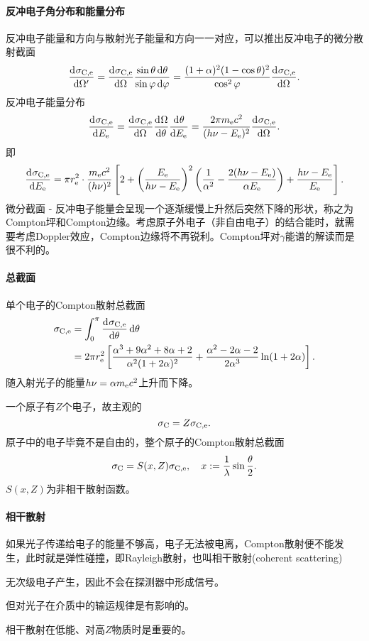 \paragraph{反冲电子角分布和能量分布}
反冲电子能量和方向与散射光子能量和方向一一对应，可以推出反冲电子的微分散射截面
\[
	\frac{\mathrm{d}^{{}}\sigma_{\mathrm C,\mathrm e}}{\mathrm{d}{\Omega'}^{{}}}=\frac{\mathrm{d}^{{}}\sigma_{\mathrm C,\mathrm e}}{\mathrm{d}{\Omega}^{{}}}\frac{\sin\theta\mathop{}\!\mathrm{d}\theta}{\sin\varphi\mathop{}\!\mathrm{d}\varphi}=\frac{(1+\alpha)^2(1-\cos\theta)^2}{\cos^2\varphi}\frac{\mathrm{d}^{{}}\sigma_{\mathrm C,\mathrm e}}{\mathrm{d}{\Omega}^{{}}}.
\]
反冲电子能量分布
\[
	\frac{\mathrm{d}^{{}}\sigma_{\mathrm C,\mathrm e}}{\mathrm{d}{E_\mathrm e}^{{}}}=\frac{\mathrm{d}^{{}}\sigma_{\mathrm C,\mathrm e}}{\mathrm{d}{\Omega}^{{}}}\frac{\mathrm{d}^{{}}\Omega}{\mathrm{d}{\theta}^{{}}}\frac{\mathrm{d}^{{}}\theta}{\mathrm{d}{E_\mathrm e}^{{}}}=\frac{2\pi m_\mathrm e c^2}{(h\nu-E_\mathrm e)^2}\frac{\mathrm{d}^{{}}\sigma_{\mathrm C,\mathrm e}}{\mathrm{d}{\Omega}^{{}}}.
\]
即
\[
	\frac{\mathrm{d}^{{}}\sigma_{\mathrm C,\mathrm e}}{\mathrm{d}{E_\mathrm e}^{{}}}=\pi r_\mathrm e^2\cdot\frac{m_\mathrm e c^2}{(h\nu)^2}\left[2+\left(\frac{E_\mathrm e}{h\nu-E_\mathrm e}\right)^2\left(\frac1{\alpha^2}-\frac{2(h\nu-E_\mathrm e)}{\alpha E_\mathrm e}\right)+\frac{h\nu-E_\mathrm e}{E_\mathrm e}\right].
\]
微分截面 - 反冲电子能量会呈现一个逐渐缓慢上升然后突然下降的形状，称之为Compton坪和Compton边缘。考虑原子外电子（非自由电子）的结合能时，就需要考虑Doppler效应，Compton边缘将不再锐利。Compton坪对$\gamma$能谱的解读而是很不利的。

\paragraph{总截面}单个电子的Compton散射总截面
\begin{align*}
	\sigma_{\mathrm C,\mathrm e}&=\int_0^\pi\frac{\mathrm{d}^{{}}\sigma_{\mathrm C,\mathrm e}}{\mathrm{d}{\theta}^{{}}}\mathop{}\!\mathrm{d}\theta\\
	&=2\pi r_\mathrm e^2\left[\frac{\alpha^3+9\alpha^2+8\alpha+2}{\alpha^2(1+2\alpha)^2}+\frac{\alpha^2-2\alpha-2}{2\alpha^3}\ln(1+2\alpha)\right].
\end{align*}
随入射光子的能量$h\nu=\alpha m_\mathrm e c^2$上升而下降。

一个原子有$Z$个电子，故主观的
\[
	\sigma_\mathrm C=Z\sigma_{\mathrm C,\mathrm e}.
\]
原子中的电子毕竟不是自由的，整个原子的Compton散射总截面
\begin{align}
	\sigma_\mathrm C=S(x,Z)\sigma_{\mathrm C,\mathrm e},\quad x:=\frac1\lambda\sin\frac\theta{2}.
\end{align}
$S(x,Z)$为非相干散射函数。
\paragraph{相干散射}
如果光子传递给电子的能量不够高，电子无法被电离，Compton散射便不能发生，此时就是弹性碰撞，即Rayleigh散射，也叫相干散射(coherent scattering)
\begin{compactenum}
	\item 无次级电子产生，因此不会在探测器中形成信号。
	\item 但对光子在介质中的输运规律是有影响的。
	\item 相干散射在低能、对高$Z$物质时是重要的。
\end{compactenum}
